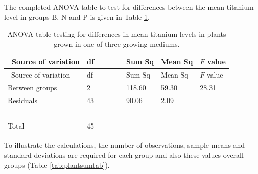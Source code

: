 \documentclass[
  oneside]{krantz}
\begin{document}
The completed ANOVA table to test for differences between the mean titanium level in groups B, N and P is given in Table \ref{tab:anovatitanium}.

\begin{longtable}[]{@{}lllll@{}}
\caption{\label{tab:anovatitanium} ANOVA table testing for differences in mean titanium levels in plants grown in one of three growing mediums.}\tabularnewline
\toprule
~Source of variation & df & Sum Sq & Mean Sq & \(F\) value\tabularnewline
\midrule
\endfirsthead
\toprule
~Source of variation & df & Sum Sq & Mean Sq & \(F\) value\tabularnewline
\midrule
\endhead
Between groups & 2 & 118.60 & 59.30 & 28.31\tabularnewline
Residuals & 43 & 90.06 & 2.09 &\tabularnewline
--------------- & -------------- & --------- & ---------- & --\tabularnewline
Total & 45 & & &\tabularnewline
\bottomrule
\end{longtable}

To illustrate the calculations, the number of observations, sample means and standard deviations are required for each group and also these values overall groups (Table \ref{tab:plantsumtab}).
\end{document}
